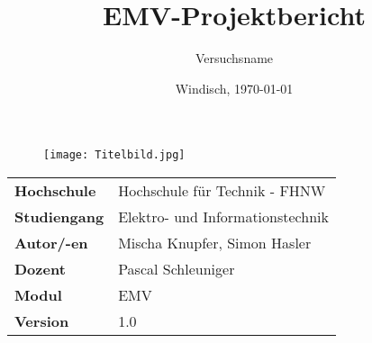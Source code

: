 \documentclass[final]{fhnwreport}       %
\title{\Huge{\textbf{EMV-Projektbericht}}\\}          %
\author{\huge{Versuchsname}}          %
\date{Windisch, \today}             %
\begin{document}
\maketitle
\vspace*{-0.5cm}						    %
\vfill
\begin{figure}[H]
\centering
\texttt{[image: Titelbild.jpg]}
\end{figure}
\vfill

{
\renewcommand\arraystretch{2}
\begin{center}
\begin{tabular}{>{\bf}p{4cm} l}
Hochschule                 &    Hochschule für Technik - FHNW\\
Studiengang                &    Elektro- und Informationstechnik\\
Autor/-en  		           & 	Mischa Knupfer, Simon Hasler\\
Dozent                   &    Pascal Schleuniger\\
Modul               &    EMV\\
Version                    &    1.0 %
\end{tabular}
\end{center}
}

\clearpage
			
\thispagestyle{empty}


\tableofcontents
\clearpage













{\sloppypar
\printbibliography[heading=bibintoc]
\label{sec:lit}
}



{%
}
\end{document}
